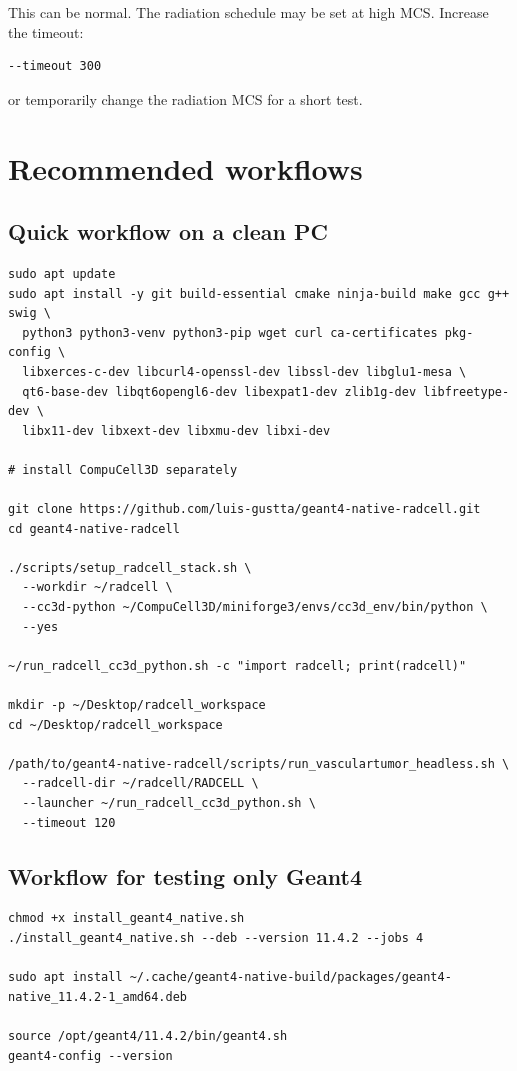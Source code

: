 \documentclass[11pt,a4paper,twoside,pdftex]{refrep}
\begin{document}
This can be normal. The radiation schedule may be set at high MCS. Increase the timeout:

\begin{lstlisting}
--timeout 300
\end{lstlisting}

or temporarily change the radiation MCS for a short test.

\chapter{Recommended workflows}

\section{Quick workflow on a clean PC}

\begin{lstlisting}
sudo apt update
sudo apt install -y git build-essential cmake ninja-build make gcc g++ swig \
  python3 python3-venv python3-pip wget curl ca-certificates pkg-config \
  libxerces-c-dev libcurl4-openssl-dev libssl-dev libglu1-mesa \
  qt6-base-dev libqt6opengl6-dev libexpat1-dev zlib1g-dev libfreetype-dev \
  libx11-dev libxext-dev libxmu-dev libxi-dev

# install CompuCell3D separately

git clone https://github.com/luis-gustta/geant4-native-radcell.git
cd geant4-native-radcell

./scripts/setup_radcell_stack.sh \
  --workdir ~/radcell \
  --cc3d-python ~/CompuCell3D/miniforge3/envs/cc3d_env/bin/python \
  --yes

~/run_radcell_cc3d_python.sh -c "import radcell; print(radcell)"

mkdir -p ~/Desktop/radcell_workspace
cd ~/Desktop/radcell_workspace

/path/to/geant4-native-radcell/scripts/run_vasculartumor_headless.sh \
  --radcell-dir ~/radcell/RADCELL \
  --launcher ~/run_radcell_cc3d_python.sh \
  --timeout 120
\end{lstlisting}

\section{Workflow for testing only Geant4}

\begin{lstlisting}
chmod +x install_geant4_native.sh
./install_geant4_native.sh --deb --version 11.4.2 --jobs 4

sudo apt install ~/.cache/geant4-native-build/packages/geant4-native_11.4.2-1_amd64.deb

source /opt/geant4/11.4.2/bin/geant4.sh
geant4-config --version
\end{lstlisting}
\end{document}

